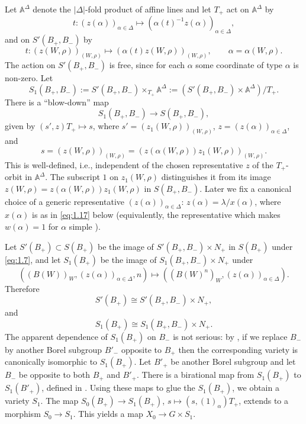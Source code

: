 \documentclass[12pt,letterpaper]{amsart}
\theoremstyle{plain}
\theoremstyle{definition}
\theoremstyle{remark}
\theoremstyle{definition}
\newcommand{\aaa}{\mathbb{A}}
\begin{document}
Let $\aaa^\Delta$ denote the $|\Delta|$-fold product
of affine lines and let $T_+$ act on $\aaa^\Delta$ by
\[
t:(z(\alpha))_{\alpha\in\Delta}\longmapsto
(\alpha(t)^{-1}z(\alpha))_{\alpha\in\Delta},
\]
and on $S'(B_+,B_-)$ by
\[
t:(z(W,\rho))_{(W,\rho)}\longmapsto
(\alpha(t)z(W,\rho))_{(W,\rho)},\qquad \alpha=\alpha(W,\rho).
\]
The action on $S'(B_+,B_-)$ is free, since for each $\alpha$ some coordinate of
type $\alpha$ is non-zero. Let
\begin{equation}\tag{1.13}\label{eq:1.13}
S_1(B_+,B_-):=S'(B_+,B_-)\times_{T_+}\aaa^\Delta:=
(S'(B_+,B_-)\times\aaa^\Delta)/T_+.
\end{equation}
There is a ``blow-down'' map
\begin{equation}\tag{1.14}\label{eq:1.14}
S_1(B_+,B_-)\rightarrow S(B_+,B_-),
\end{equation}
given by $(s',z)T_+\longmapsto s$, where
$s'=(z_1(W,\rho))_{(W,\rho)}$,
$z=(z(\alpha))_{\alpha\in\Delta}$, and
\[
s=(z(W,\rho))_{(W,\rho)}
=(z(\alpha(W,\rho))z_1(W,\rho))_{(W,\rho)}.
\]
This is well-defined, i.e., independent of the chosen
representative $z$ of the $T_+$-orbit in $\aaa^\Delta$.
The subscript $1$ on $z_1(W,\rho)$ distinguishes it
from its image $z(W,\rho)=z(\alpha(W,\rho))z_1(W,\rho)$ in $S(B_+,B_-)$.
Later we fix a canonical choice of a generic representative
$(z(\alpha))_{\alpha\in\Delta}$:
$z(\alpha)=\lambda /x(\alpha)$, where $x(\alpha)$ is as in
\eqref{eq:1.17} below (equivalently, the representative
which makes $w(\alpha)=1$ for $\alpha$ simple \cite[Ch.~II, \S 2]{Ha92a}).

Let $S'(B_+)\subset S(B_+)$ be the image of
$S'(B_+,B_-)\times N_+$ in $S(B_+)$ under \eqref{eq:1.7},
and let $S_1(B_+)$ be the image of $S_1(B_+,B_-)\times N_+$ under
\[
((B(W))_{W},(z(\alpha))_{\alpha\in\Delta},n)
\longmapsto ((B(W)^n)_{W},(z(\alpha))_{\alpha\in\Delta}).
\]
Therefore
\begin{equation}\tag{1.15a}\label{eq:1.15a}
S'(B_+)\cong S'(B_+,B_-)\times N_+,
\end{equation}
and
\begin{equation}\tag{1.15b}\label{eq:1.15b}
S_1(B_+)\cong S_1(B_+,B_-)\times N_+.
\end{equation}
The apparent dependence of $S_1(B_+)$ on $B_-$ is not serious:
by \cite[Lemma~3.6]{La83}, if we replace $B_-$ by another
Borel subgroup $B'_-$ opposite
to $B_+$ then the corresponding variety is canonically isomorphic
to $S_1(B_+)$.
Let $B'_+$ be another Borel subgroup and let $B_-$ be opposite to both
$B_+$ and $B'_+$. There is a birational map from
$S_1(B_+)$ to $S_1(B'_+)$, defined in \cite{La83}. Using these maps
to glue the $S_1(B_+)$, we obtain
a variety $S_1$.
The map $S_0(B_+)\rightarrow S_1(B_+)$, $s\mapsto (s,(1)_\alpha)T_+$,
extends to a morphism $S_0\rightarrow S_1$. This yields a map
$X_0\rightarrow G\times S_1$.
\end{document}
